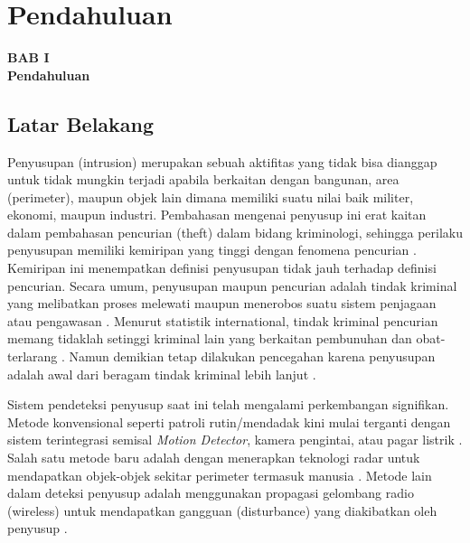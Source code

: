 \documentclass[12pt]{article}
\begin{document}
\newpage
\thispagestyle{plain}
\mbox{}

\newpage

	\setcounter{page}{9}

	\setcounter{section}{0}
	
	\setcounter{figure}{0}
	
	\section{Pendahuluan}
	
	\begin{center}
		{\large \textbf{BAB I}} \\
		{\large \textbf{Pendahuluan}}
	\end{center}
	
	\subsection{Latar Belakang}
	
	Penyusupan (intrusion) merupakan sebuah aktifitas yang tidak bisa dianggap untuk tidak mungkin terjadi apabila berkaitan dengan bangunan, area (perimeter), maupun objek lain dimana memiliki suatu nilai baik militer, ekonomi, maupun industri\cite{Assets}.
	Pembahasan mengenai penyusup ini erat kaitan dalam pembahasan pencurian (theft) dalam bidang kriminologi, sehingga perilaku penyusupan memiliki kemiripan yang tinggi dengan fenomena pencurian \cite{Felson1998}.
	Kemiripan ini menempatkan definisi penyusupan tidak jauh terhadap definisi pencurian. Secara umum, penyusupan maupun pencurian adalah tindak kriminal yang melibatkan proses melewati maupun menerobos suatu sistem penjagaan atau pengawasan \cite{Chapman}.
	Menurut statistik international, tindak kriminal pencurian memang tidaklah setinggi kriminal lain yang berkaitan pembunuhan dan obat-terlarang \cite{Frate2010}.
	Namun demikian tetap dilakukan pencegahan karena penyusupan adalah awal dari beragam tindak kriminal lebih lanjut \cite{Nesbit}.
	
	Sistem pendeteksi penyusup saat ini telah mengalami perkembangan signifikan.
	Metode konvensional seperti patroli rutin/mendadak kini mulai terganti dengan sistem terintegrasi semisal \textit{Motion Detector}, kamera pengintai, atau pagar listrik \cite{AFL2011}.
	Salah satu metode baru adalah dengan menerapkan teknologi radar untuk mendapatkan objek-objek sekitar perimeter termasuk manusia \cite{Cory1998}.
	Metode lain dalam deteksi penyusup adalah menggunakan propagasi gelombang radio (wireless) untuk mendapatkan gangguan (disturbance) yang diakibatkan oleh penyusup \cite{Elmorsy}\cite{Elmorsy2014}.
	
\end{document}
